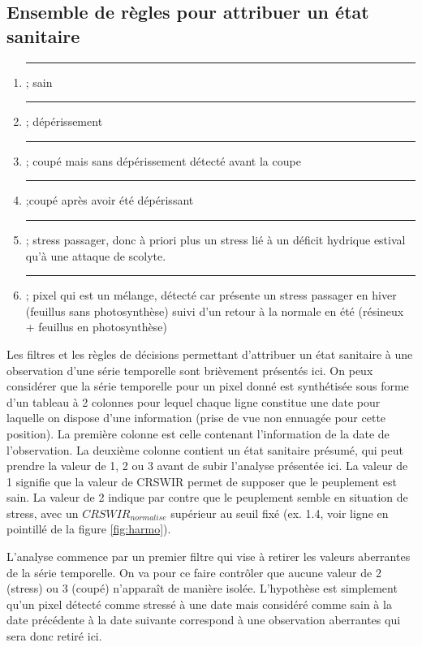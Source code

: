 \documentclass[a4paper, 12pt]{article} %
\newcommand\crule[3][black]{\textcolor{#1}{\rule{#2}{#3}}}
\begin{document}
\subsection{Ensemble de règles pour attribuer un état sanitaire}\label{subsec:ES}

\begin{enumerate}

	\item \crule[cl1]{1cm}{1cm} ; sain 

	\item \crule[cl2]{1cm}{1cm} ; dépérissement 

	\item \crule[cl3]{1cm}{1cm} ; coupé mais sans dépérissement détecté avant la coupe 

	\item  \crule[cl4]{1cm}{1cm} ;coupé après avoir été dépérissant
	\item \crule[cl5]{1cm}{1cm} ; stress passager, donc à priori plus un stress lié à un déficit hydrique estival qu'à une attaque de scolyte. 
	\item \crule[cl6]{1cm}{1cm} ; pixel qui est un mélange, détecté car présente un stress passager en hiver (feuillus sans photosynthèse) suivi d'un retour à la normale en été (résineux + feuillus en photosynthèse) 
\end{enumerate}


Les filtres et les règles de décisions permettant d'attribuer un état sanitaire à une observation d'une série temporelle sont brièvement présentés ici. On peux considérer que la série temporelle pour un pixel donné est synthétisée sous forme d'un tableau à 2 colonnes pour lequel chaque ligne constitue une date pour laquelle on dispose d'une information (prise de vue non ennuagée pour cette position). La première colonne est celle contenant l'information de la date de l'observation. La deuxième colonne contient un état sanitaire présumé, qui peut prendre la valeur de 1, 2 ou 3 avant de subir l'analyse présentée ici. La valeur de 1 signifie que la valeur de CRSWIR permet de supposer que le peuplement est sain. La valeur de 2 indique par contre que le peuplement semble en situation de stress, avec un $CRSWIR_{normalise}$ supérieur au seuil fixé (ex. 1.4, voir ligne en pointillé de la figure \ref{fig:harmo}).

L'analyse commence par un premier filtre qui vise à retirer les valeurs aberrantes de la série temporelle. On va pour ce faire contrôler que aucune valeur de 2 (stress) ou 3 (coupé) n'apparaît de manière isolée. L'hypothèse est simplement qu'un pixel détecté comme stressé à une date mais considéré comme sain à la date précédente à la date suivante correspond à une observation aberrantes qui sera donc retiré ici.
\end{document}
